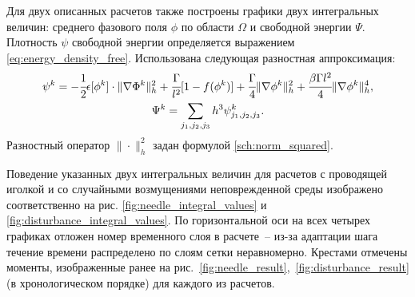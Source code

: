 Для двух описанных расчетов также построены графики двух интегральных величин: среднего фазового поля $\phi$ по области $\Omega$ и свободной энергии $\Psi$. Плотность $\psi$ свободной энергии определяется выражением \eqref{eq:energy_density_free}. Использована следующая разностная аппроксимация:
\begin{gather*}
    \psi^k = -\cfrac{1}{2} \epsilon[\phi^k] \cdot \| \nabla \Phi^k \|_h^2 + \cfrac{\Gamma}{l^2} [1 - f(\phi^k)] + \cfrac{\Gamma}{4} \| \nabla \phi^k \|_h^2 + \cfrac{\beta \Gamma l^2}{4} \| \nabla \phi^k \|_h^4, \\
    \Psi^k = \sum\limits_{j_1,j_2,j_3} h^3 \psi_{j_1,j_2,j_3}^k.
\end{gather*}
Разностный оператор $\| \cdot \|_h^2$ задан формулой \eqref{sch:norm_squared}.

Поведение указанных двух интегральных величин для расчетов с проводящей иголкой и со случайными возмущениями неповрежденной среды изображено соответственно на рис. \ref{fig:needle_integral_values} и \ref{fig:disturbance_integral_values}. По горизонтальной оси на всех четырех графиках отложен номер временного слоя в расчете~-- из-за адаптации шага течение времени распределено по слоям сетки неравномерно. Крестами отмечены моменты, изображенные ранее на рис.~\ref{fig:needle_result},~\ref{fig:disturbance_result} (в хронологическом порядке) для каждого из расчетов.


